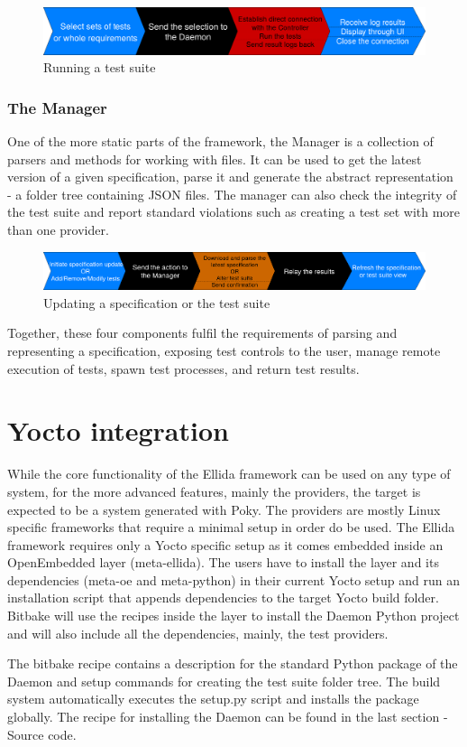 \begin{figure}[h!]
  \centering
	\includegraphics[width=\textwidth]{images/execution_flow2.png}
    \caption{Running a test suite}
\end{figure}

\subsubsection*{The Manager}
One of the more static parts of the framework, the Manager is a collection of parsers and methods for working with files. It can be used to get the latest version of a given specification, parse it and generate the abstract representation - a folder tree containing JSON files. The manager can also check the integrity of the test suite and report standard violations such as creating a test set with more than one provider.

\begin{figure}[h!]
  \centering
	\includegraphics[width=\textwidth]{images/execution_flow1.png}
    \caption{Updating a specification or the test suite}
\end{figure}

\vspace{7mm}

Together, these four components fulfil the requirements of parsing and representing a specification, exposing test controls to the user, manage remote execution of tests, spawn test processes, and return test results.

\section{Yocto integration}

While the core functionality of the Ellida framework can be used on any type of system, for the more advanced features, mainly the providers, the target is expected to be a system generated with Poky. The providers are mostly Linux specific frameworks that require a minimal setup in order do be used. The Ellida framework requires only a Yocto specific setup as it comes embedded inside an OpenEmbedded layer (meta-ellida). The users have to install the layer and its dependencies (meta-oe and meta-python) in their current Yocto setup and run an installation script that appends dependencies to the target Yocto build folder. Bitbake will use the recipes inside the layer to install the Daemon Python project and will also include all the dependencies, mainly, the test providers.

The bitbake recipe contains a description for the standard Python package of the Daemon and setup commands for creating the test suite folder tree. The build system automatically executes the setup.py script and installs the package globally. The recipe for installing the Daemon can be found in the last section - Source code.

